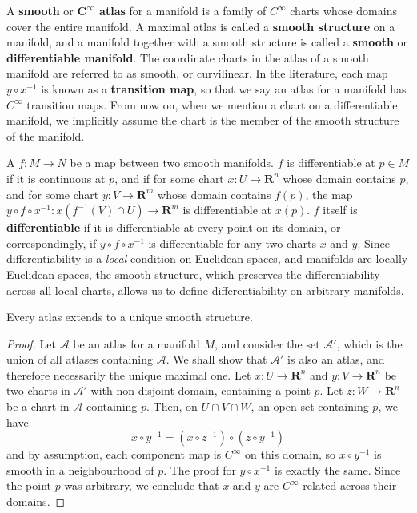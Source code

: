A {\bf smooth} or {\bf $\mathbf{C^\infty}$ atlas} for a manifold is a family of $C^\infty$ charts whose domains cover the entire manifold. A maximal atlas is called a {\bf smooth structure} on a manifold, and a manifold together with a smooth structure is called a {\bf smooth} or {\bf differentiable manifold}. The coordinate charts in the atlas of a smooth manifold are referred to as smooth, or curvilinear. In the literature, each map $y \circ x^{-1}$ is known as a {\bf transition map}, so that we say an atlas for a manifold has $C^\infty$ transition maps. From now on, when we mention a chart on a differentiable manifold, we implicitly assume the chart is the member of the smooth structure of the manifold.

A $f:M \to N$ be a map between two smooth manifolds. $f$ is differentiable at $p \in M$ if it is continuous at $p$, and if for some chart $x:U \to \mathbf{R}^n$ whose domain contains $p$, and for some chart $y:V \to \mathbf{R}^m$ whose domain contains $f(p)$, the map $y \circ f \circ x^{-1}:x(f^{-1}(V) \cap U) \to \mathbf{R}^m$ is differentiable at $x(p)$. $f$ itself is {\bf differentiable} if it is differentiable at every point on its domain, or correspondingly, if $y \circ f \circ x^{-1}$ is differentiable for any two charts $x$ and $y$. Since differentiability is a {\it local} condition on Euclidean spaces, and manifolds are locally Euclidean spaces, the smooth structure, which preserves the differentiability across all local charts, allows us to define differentiability on arbitrary manifolds.

\begin{lemma}
    Every atlas extends to a unique smooth structure.
\end{lemma}
\begin{proof}
Let $\mathcal{A}$ be an atlas for a manifold $M$, and consider the set $\mathcal{A}'$, which is the union of all atlases containing $\mathcal{A}$. We shall show that $\mathcal{A}'$ is also an atlas, and therefore necessarily the unique maximal one. Let $x:U \to \mathbf{R}^n$ and $y:V \to \mathbf{R}^n$ be two charts in $\mathcal{A}'$ with non-disjoint domain, containing a point $p$. Let $z:W \to \mathbf{R}^n$ be a chart in $\mathcal{A}$ containing $p$. Then, on $U \cap V \cap W$, an open set containing $p$, we have
%
\[ x \circ y^{-1} = (x \circ z^{-1}) \circ (z \circ y^{-1}) \]
%
and by assumption, each component map is $C^\infty$ on this domain, so $x \circ y^{-1}$ is smooth in a neighbourhood of $p$. The proof for $y \circ x^{-1}$ is exactly the same. Since the point $p$ was arbitrary, we conclude that $x$ and $y$ are $C^\infty$ related across their domains.
\end{proof}

